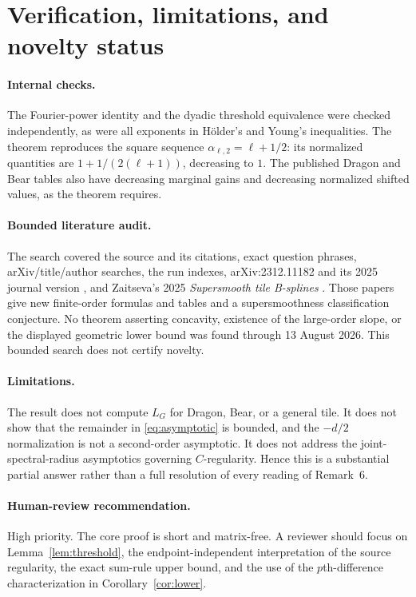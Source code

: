 \documentclass[11pt]{article}
\theoremstyle{remark}
\begin{document}
\section{Verification, limitations, and novelty status}

\paragraph{Internal checks.}
The Fourier-power identity and the dyadic threshold equivalence were checked
independently, as were all exponents in H\"older's and Young's inequalities.
The theorem reproduces
the square sequence $\alpha_{\ell,2}=\ell+1/2$: its normalized quantities are
$1+1/(2(\ell+1))$, decreasing to $1$.  The published Dragon and Bear tables
also have decreasing marginal gains and decreasing normalized shifted values,
as the theorem requires.

\paragraph{Bounded literature audit.}
The search covered the source and its citations, exact question phrases,
arXiv/title/author searches, the run indexes, arXiv:2312.11182 and its 2025
journal version \cite{ProtasovZaitseva2025}, and Zaitseva's 2025
\emph{Supersmooth tile B-splines} \cite{Zaitseva2025}.  Those papers give new
finite-order formulas and tables and a supersmoothness classification
conjecture.  No theorem asserting concavity, existence of the large-order
slope, or the displayed geometric lower bound was found through 13 August
2026.  This bounded search does not certify novelty.

\paragraph{Limitations.}
The result does not compute $L_G$ for Dragon, Bear, or a general tile.  It does
not show that the remainder in \eqref{eq:asymptotic} is bounded, and the
$-d/2$ normalization is not a second-order asymptotic.  It does not address
the joint-spectral-radius asymptotics governing $C$-regularity.  Hence this is
a substantial partial answer rather than a full resolution of every reading
of Remark~6.

\paragraph{Human-review recommendation.}
High priority.  The core proof is short and matrix-free.  A reviewer should
focus on Lemma~\ref{lem:threshold}, the endpoint-independent interpretation
of the source regularity, the exact sum-rule upper bound, and the use of the
$p$th-difference characterization in Corollary~\ref{cor:lower}.
\end{document}
